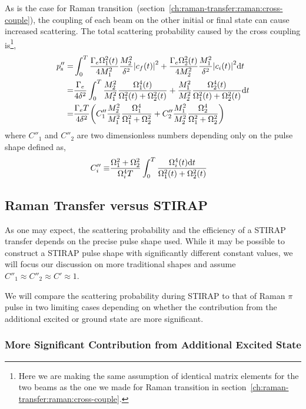 As is the case for Raman transition~(section~\ref{ch:raman-transfer:raman:cross-couple}),
the coupling of each beam on the other initial or final state can cause increased scattering.
The total scattering probability caused by the cross coupling is\footnote{
  Here we are making the same assumption of identical matrix elements for the two beams
  as the one we made for Raman transition in section~\ref{ch:raman-transfer:raman:cross-couple}.},
\begin{align*}
  p''_{\mathrm{s}}=&\int_0^T \frac{\Gamma_e\Omega_1^2(t)}{4M_1^2}\frac{M_2^2}{\delta^2}{\left|{c_f(t)}\right|}^2+\frac{\Gamma_e\Omega_2^2(t)}{4M_2^2}\frac{M_1^2}{\delta^2}{\left|{c_i(t)}\right|}^2 \mathrm{d} t\\
  =&\frac{\Gamma_e}{4\delta^2}\int_0^T \frac{M_2^2}{M_1^2}\frac{\Omega_1^4(t)}{\Omega_1^2(t)+\Omega_2^2(t)}+\frac{M_1^2}{M_2^2}\frac{\Omega_2^4(t)}{\Omega_1^2(t)+\Omega_2^2(t)} \mathrm{d} t\\
  =&\frac{\Gamma_eT}{4\delta^2}{\left({C''_1\frac{M_2^2}{M_1^2}\frac{\Omega_1^4}{\Omega_1^2+\Omega_2^2}+C''_2\frac{M_1^2}{M_2^2}\frac{\Omega_2^4}{\Omega_1^2+\Omega_2^2}}\right)}
\end{align*}
where $C''_1$ and $C''_2$ are two dimensionless numbers
depending only on the pulse shape defined as,
\begin{align*}
  C''_i\equiv&\frac{\Omega_1^2+\Omega_2^2}{\Omega_i^4T}\int_0^T \frac{\Omega_i^4(t) \mathrm{d} t}{\Omega_1^2(t)+\Omega_2^2(t)}
\end{align*}

\subsection{Raman Transfer versus STIRAP}
\label{ch:raman-transfer:stirap:raman-vs-stirap}

As one may expect, the scattering probability and the efficiency of a STIRAP transfer
depends on the precise pulse shape used.
While it may be possible to construct a STIRAP pulse shape
with significantly different constant values,
we will focus our discussion on more traditional shapes and assume
$C''_1\approx C''_2\approx C'\approx1$.

We will compare the scattering probability during STIRAP to that of
Raman $\pi$ pulse in two limiting cases depending on whether the contribution
from the additional excited or ground state are more significant.

\subsubsection{More Significant Contribution from Additional Excited State}
\label{ch:raman-transfer:stirap:raman-vs-stirap:extra-ext}


